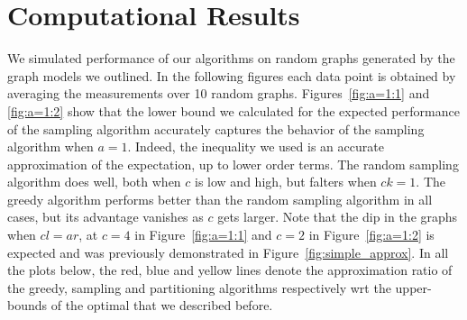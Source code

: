 \section{Computational Results}

We simulated performance of our algorithms on random graphs generated
by the graph models we outlined. In the following figures each data
point is obtained by averaging the measurements over 10 random
graphs. Figures~\ref{fig:a=1:1} and \ref{fig:a=1:2} show that the
lower bound we calculated for the expected performance of the sampling
algorithm accurately captures the behavior of the sampling algorithm
when $a=1$. Indeed, the inequality we used is an accurate
approximation of the expectation, up to lower order terms. The random
sampling algorithm does well, both when $c$ is low and high, but
falters when $ck=1$. The greedy algorithm performs better than the
random sampling algorithm in all cases, but its advantage vanishes as
$c$ gets larger. Note that the dip in the graphs when $cl=ar$, at
$c=4$ in Figure~\ref{fig:a=1:1} and $c=2$ in Figure~\ref{fig:a=1:2} is
expected and was previously demonstrated in Figure~\ref{fig:simple_approx}.  In all the
plots below, the red, blue and yellow lines denote the approximation
ratio of the greedy, sampling and partitioning algorithms respectively
wrt the upper-bounds of the optimal that we described before.

